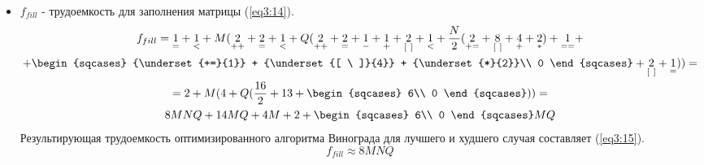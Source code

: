 \begin{itemize}
	\item $f_{fill}$ - трудоемкость для заполнения матрицы (\ref{eq3:14}).
	\begin{multline}
		f_{fill} = {\underset{=}{1}} + {\underset{<}{1}} + M({\underset{++}{2}} + {\underset{=}{2}} + {\underset{<}{1}} + Q({\underset{++}{2}} + {\underset{=}{2}} + {\underset{-}{1}} + {\underset{+}{1}} + {\underset{[\ ]}{2}} + {\underset{<}{1}} + \frac{N}{2}({\underset{+=}{2}} + {\underset{[\ ]}{8}} + {\underset{+}{4}} + {\underset{*}{2}}) + {\underset{==}{1}} + \\
		 +  \begin{sqcases}
				{\underset{+=}{1}} + {\underset{[ \ ]}{4}} + {\underset{*}{2}}\\
				0
			\end{sqcases} + {\underset{[\ ]}{2}} + {\underset{=}{1}})) = \\
		= 2 + M(4 + Q(\frac{16}{2} + 13 + \begin{sqcases}
											6\\
											0
											\end{sqcases})) = \\
		8MNQ + 14MQ + 4M + 2 + \begin{sqcases}
									6\\
									0
									\end{sqcases} MQ
		\label{eq3:14}
	\end{multline}
	Результирующая трудоемкость оптимизированного алгоритма Винограда для лучшего и худшего случая составляет (\ref{eq3:15}).
	\begin{equation}
		f_{fill} \approx 8MNQ
		\label{eq3:15}
	\end{equation}
	
\end{itemize}

